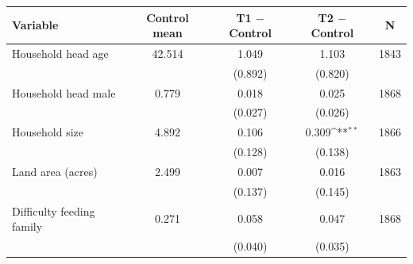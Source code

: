 {
\def\sym#1{\ifmmode^{#1}\else\(^{#1}\)\fi}
\begin{tabular}{lcccc}
\hline\hline
Variable & Control mean & T1 $-$ Control & T2 $-$ Control & N \\
\hline
Household head age & 42.514 & 1.049 & 1.103 & 1843 \\
 &  & (0.892) & (0.820) &  \\
Household head male & 0.779 & 0.018 & 0.025 & 1868 \\
 &  & (0.027) & (0.026) &  \\
Household size & 4.892 & 0.106 & 0.309\sym{**} & 1866 \\
 &  & (0.128) & (0.138) &  \\
Land area (acres) & 2.499 & 0.007 & 0.016 & 1863 \\
 &  & (0.137) & (0.145) &  \\
Difficulty feeding family & 0.271 & 0.058 & 0.047 & 1868 \\
 &  & (0.040) & (0.035) &  \\
\hline\hline
\end{tabular}
}
